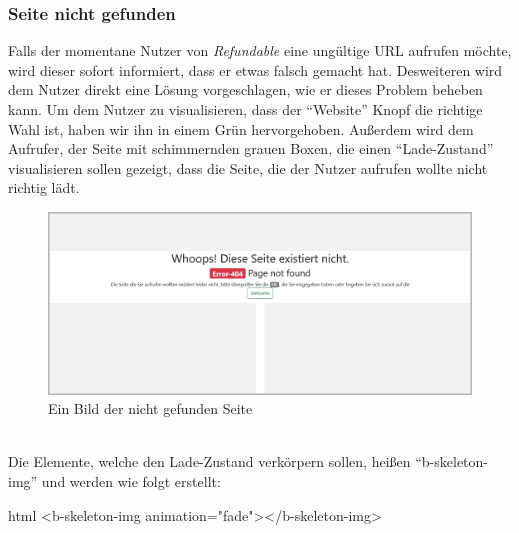 \subsubsection{Seite nicht gefunden}
\label{chapter:implementierung-frontend-komponenten-notfound}
Falls der momentane Nutzer von \textit{Refundable} eine ungültige URL aufrufen möchte, wird dieser sofort informiert, dass er etwas falsch gemacht hat. Desweiteren wird dem Nutzer direkt eine Lösung vorgeschlagen, wie er dieses Problem beheben kann. Um dem Nutzer zu visualisieren, dass der \enquote{Website} Knopf die richtige Wahl ist, haben wir ihn in einem Grün hervorgehoben. Außerdem wird dem Aufrufer, der Seite mit schimmernden grauen Boxen, die einen \enquote{Lade-Zustand} visualisieren sollen gezeigt, dass die Seite, die der Nutzer aufrufen wollte nicht richtig lädt.
\begin{figure}[H]
	\centering
	\includegraphics[width=1\linewidth]{images/ldehner_implementierung/notfound}
	\caption[Nicht gefunden Seite]{Ein Bild der nicht gefunden Seite}
	\label{fig:notfoundsite}
\end{figure}
~\\
Die Elemente, welche den Lade-Zustand verkörpern sollen, heißen \enquote{b-skeleton-img} und werden wie folgt erstellt:
\begin{code}{html}
	<b-skeleton-img animation="fade"></b-skeleton-img>
\end{code}
	\label{list:codeskeleton} ~\\

\newpage
